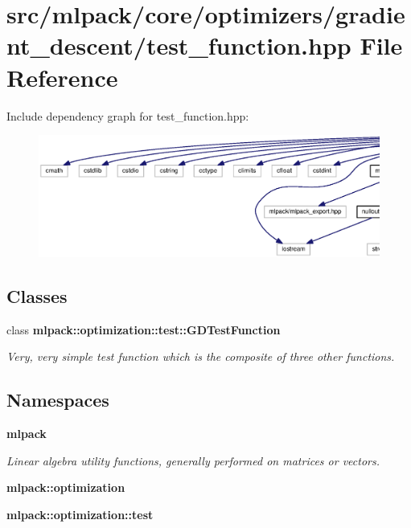 \section{src/mlpack/core/optimizers/gradient\+\_\+descent/test\+\_\+function.hpp File Reference}
\label{gradient__descent_2test__function_8hpp}
Include dependency graph for test\+\_\+function.\+hpp\+:
\nopagebreak
\begin{figure}[H]
\begin{center}
\leavevmode
\includegraphics[width=350pt]{gradient__descent_2test__function_8hpp__incl}
\end{center}
\end{figure}
\subsection*{Classes}
\begin{DoxyCompactItemize}
\item 
class {\bf mlpack\+::optimization\+::test\+::\+G\+D\+Test\+Function}
\begin{DoxyCompactList}\small\item\em Very, very simple test function which is the composite of three other functions. \end{DoxyCompactList}\end{DoxyCompactItemize}
\subsection*{Namespaces}
\begin{DoxyCompactItemize}
\item 
 {\bf mlpack}
\begin{DoxyCompactList}\small\item\em Linear algebra utility functions, generally performed on matrices or vectors. \end{DoxyCompactList}\item 
 {\bf mlpack\+::optimization}
\item 
 {\bf mlpack\+::optimization\+::test}
\end{DoxyCompactItemize}
